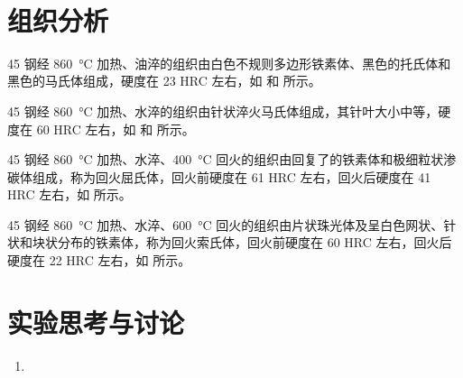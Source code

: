 \begin{figure}[!ht]
     \\
\end{figure}
\section{组织分析}
45 钢经 \SI{860}{\degreeCelsius} 加热、油淬的组织由白色不规则多边形铁素体、黑色的托氏体和黑色的马氏体组成，硬度在 23 HRC 左右，如 和 所示。\par
45 钢经 \SI{860}{\degreeCelsius} 加热、水淬的组织由针状淬火马氏体组成，其针叶大小中等，硬度在 60 HRC 左右，如 和 所示。\par
45 钢经 \SI{860}{\degreeCelsius} 加热、水淬、\SI{400}{\degreeCelsius} 回火的组织由回复了的铁素体和极细粒状渗碳体组成，称为回火屈氏体，回火前硬度在 61 HRC 左右，回火后硬度在 41 HRC 左右，如 所示。\par
45 钢经 \SI{860}{\degreeCelsius} 加热、水淬、\SI{600}{\degreeCelsius} 回火的组织由片状珠光体及呈白色网状、针状和块状分布的铁素体，称为回火索氏体，回火前硬度在 60 HRC 左右，回火后硬度在 22 HRC 左右，如 所示。\par
\section{实验思考与讨论}
\begin{enumerate}
    \item {}
\end{enumerate}